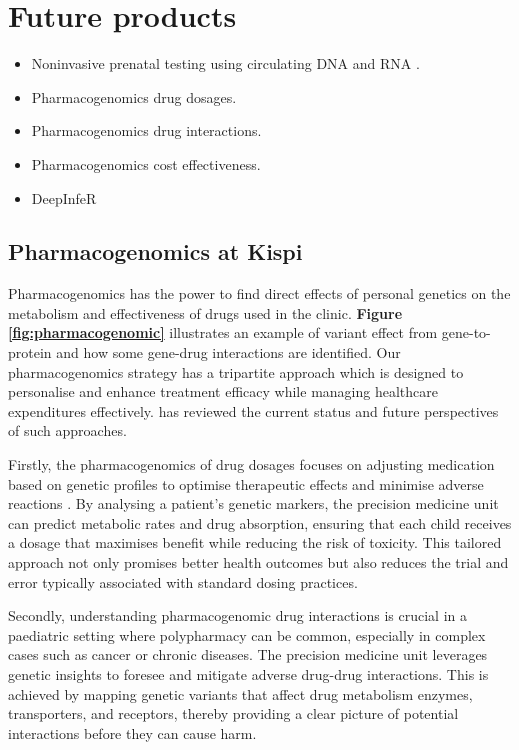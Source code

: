 \section{Future products}

\begin{itemize}
\item Noninvasive prenatal testing using circulating DNA and RNA 
\citep{moufarrej2023noninvasive}.
\item Pharmacogenomics drug dosages.
\item Pharmacogenomics drug interactions.
\item Pharmacogenomics cost effectiveness.
\item DeepInfeR
\end{itemize}


\subsection{Pharmacogenomics at Kispi}

Pharmacogenomics has the power to find direct effects of personal genetics on the metabolism and effectiveness of drugs used in the clinic. 
\textbf{Figure
\ref{fig:pharmacogenomic}}
illustrates an example of variant effect from gene-to-protein and how some gene-drug interactions are identified. 
Our pharmacogenomics strategy has a tripartite approach which is designed to personalise and enhance treatment efficacy while managing healthcare expenditures effectively.
\citet{pirmohamed2023pharmacogenomics} has reviewed the current status and future perspectives of such approaches.

Firstly, the pharmacogenomics of drug dosages focuses on adjusting medication based on genetic profiles to optimise therapeutic effects and minimise adverse reactions 
\citep{yip2015pharmacogenetic}.
By analysing a patient's genetic markers, the precision medicine unit can predict metabolic rates and drug absorption, ensuring that each child receives a dosage that maximises benefit while reducing the risk of toxicity. 
This tailored approach not only promises better health outcomes but also reduces the trial and error typically associated with standard dosing practices.

Secondly, understanding pharmacogenomic drug interactions is crucial in a paediatric setting where polypharmacy can be common, especially in complex cases such as cancer or chronic diseases. 
The precision medicine unit leverages genetic insights to foresee and mitigate adverse drug-drug interactions. 
This is achieved by mapping genetic variants that affect drug metabolism enzymes, transporters, and receptors, thereby providing a clear picture of potential interactions before they can cause harm.


